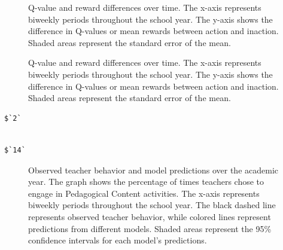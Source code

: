 \documentclass[
  number,
  preprint,
  3p,
  onecolumn]{elsarticle}
\begin{document}
\begin{figure}


\caption{\label{fig-q-value-reward-diff-1}Q-value and reward differences
over time. The x-axis represents biweekly periods throughout the school
year. The y-axis shows the difference in Q-values or mean rewards
between action and inaction. Shaded areas represent the standard error
of the mean.}

\end{figure}%

\begin{figure}


\caption{\label{fig-q-value-reward-diff-2}Q-value and reward differences
over time. The x-axis represents biweekly periods throughout the school
year. The y-axis shows the difference in Q-values or mean rewards
between action and inaction. Shaded areas represent the standard error
of the mean.}

\end{figure}%

\begin{verbatim}
$`2`
\end{verbatim}

\begin{verbatim}

$`14`
\end{verbatim}

\begin{figure}


\caption{\label{fig-action-percentages-1}Observed teacher behavior and
model predictions over the academic year. The graph shows the percentage
of times teachers chose to engage in Pedagogical Content activities. The
x-axis represents biweekly periods throughout the school year. The black
dashed line represents observed teacher behavior, while colored lines
represent predictions from different models. Shaded areas represent the
95\% confidence intervals for each model's predictions.}

\end{figure}%
\end{document}
